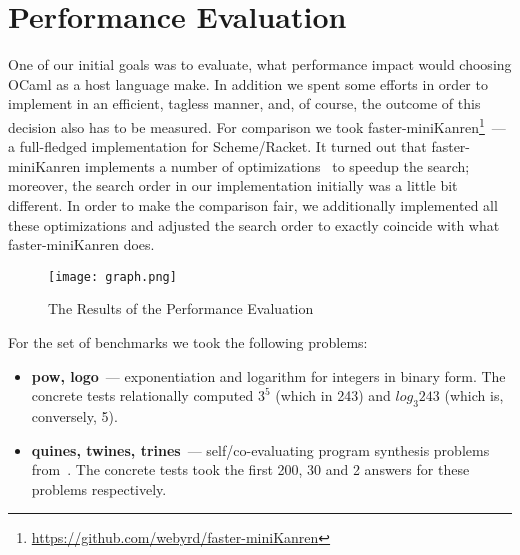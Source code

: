 
\section{Performance Evaluation}
\label{sec:evaluation}

One of our initial goals was to evaluate, what performance impact would choosing OCaml as a host language make. In addition we spent some 
efforts in order to implement \miniKanren in an efficient, tagless manner, and, of course, the outcome of this decision also has to be 
measured. For comparison we took faster-miniKanren\footnote{\url{https://github.com/webyrd/faster-miniKanren}}~--- a full-fledged 
\miniKanren implementation for Scheme/Racket. It turned out that faster-miniKanren implements a number of optimizations~\cite{WillThesis, Optimizations} 
to speedup the search; moreover, the search order in our implementation initially was a little bit different. In order to make the comparison
fair, we additionally implemented all these optimizations and adjusted the search order to exactly coincide with 
what faster-miniKanren does.

\begin{figure}[t]
\centering
\texttt{[image: graph.png]}
\caption{The Results of the Performance Evaluation}
\label{eval}
\end{figure}

\FloatBarrier 

For the set of benchmarks we took the following problems:

\begin{itemize}
\item \textbf{pow, logo}~--- exponentiation and logarithm for integers in binary form. The concrete tests relationally computed
$3^5$ (which in 243) and $log_3 243$ (which is, conversely, 5).
\item \textbf{quines, twines, trines}~--- self/co-evaluating program synthesis problems from~\cite{Untagged}. The
concrete tests took the first 200, 30 and 2 answers for these problems respectively.
\end{itemize}

